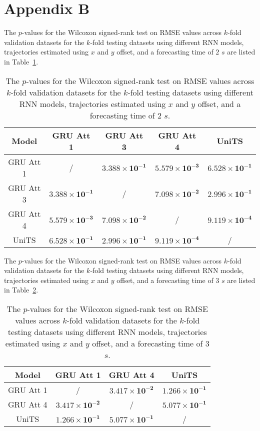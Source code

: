 \appendix
\section{Appendix B}
\label{appB}

The $p$-values for the Wilcoxon signed-rank test on RMSE values across $k$-fold validation datasets for the $k$-fold testing datasets using different RNN models, trajectories estimated using $x$ and $y$ offset, and a forecasting time of $2$ $s$ are listed in Table~\ref{tab:RMSE:no:abs:p:2}.

\begin{table}[!ht]
	\centering
	\begin{tabular}{|c|c|c|c|c|}
		\hline
		Model & GRU Att 1 & GRU Att 3 & GRU Att 4 & UniTS \\ \hline
		GRU Att 1 & / & $\mathbf{3.388 \times 10^{-1}}$ & $\mathbf{5.579 \times 10^{-3}}$ & $\mathbf{6.528 \times 10^{-1}}$ \\ \hline
		GRU Att 3 & $\mathbf{3.388 \times 10^{-1}}$ & / & $\mathbf{7.098 \times 10^{-2}}$ & $\mathbf{2.996 \times 10^{-1}}$ \\ \hline
		GRU Att 4 & $\mathbf{5.579 \times 10^{-3}}$ & $\mathbf{7.098 \times 10^{-2}}$ & / & $\mathbf{9.119 \times 10^{-4}}$ \\ \hline
		UniTS & $\mathbf{6.528 \times 10^{-1}}$ & $\mathbf{2.996 \times 10^{-1}}$ & $\mathbf{9.119 \times 10^{-4}}$ & / \\ \hline
	\end{tabular}
	\caption{The $p$-values for the Wilcoxon signed-rank test on RMSE values across $k$-fold validation datasets for the $k$-fold testing datasets using different RNN models, trajectories estimated using $x$ and $y$ offset, and a forecasting time of $2$ $s$.}
	\label{tab:RMSE:no:abs:p:2}
\end{table}

The $p$-values for the Wilcoxon signed-rank test on RMSE values across $k$-fold validation datasets for the $k$-fold testing datasets using different RNN models, trajectories estimated using $x$ and $y$ offset, and a forecasting time of $3$ $s$ are listed in Table~\ref{tab:RMSE:no:abs:p:3}.

\begin{table}[!ht]
	\centering
	\begin{tabular}{|c|c|c|c|}
		\hline
		Model & GRU Att 1 & GRU Att 4 & UniTS \\ \hline
		GRU Att 1 & / & $\mathbf{3.417 \times 10^{-2}}$ & $\mathbf{1.266 \times 10^{-1}}$ \\ \hline
		GRU Att 4 & $\mathbf{3.417 \times 10^{-2}}$ & / & $\mathbf{5.077 \times 10^{-1}}$ \\ \hline
		UniTS & $\mathbf{1.266 \times 10^{-1}}$ & $\mathbf{5.077 \times 10^{-1}}$ & / \\ \hline
	\end{tabular}
	\caption{The $p$-values for the Wilcoxon signed-rank test on RMSE values across $k$-fold validation datasets for the $k$-fold testing datasets using different RNN models, trajectories estimated using $x$ and $y$ offset, and a forecasting time of $3$ $s$.}
	\label{tab:RMSE:no:abs:p:3}
\end{table}

